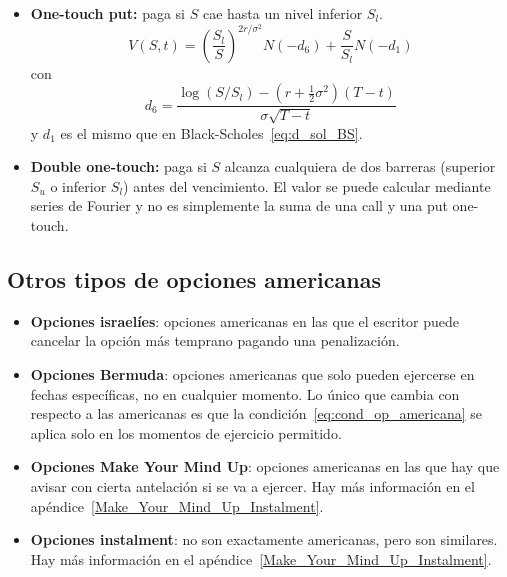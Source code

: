 \begin{itemize}
\begin{figure}[H]
\begin{subfigure}[b]{0.35\linewidth}
            \caption{Delta de una opción one-touch call}
        \end{subfigure}
    \end{figure}
    \item \textbf{One-touch put:} paga si $S$ cae hasta un nivel inferior $S_l$.
    \[
        \boxed{V(S, t) = \left( \frac{S_l}{S} \right)^{2r/\sigma^2} N(-d_6) + \frac{S}{S_l} N(-d_1)}
    \]
    con
    \[
        \boxed{d_6 = \frac{\log(S/S_l) - (r + \frac{1}{2}\sigma^2)(T-t)}{\sigma\sqrt{T-t}}}
    \]
    y $d_1$ es el mismo que en Black-Scholes~\eqref{eq:d_sol_BS}.
    \item \textbf{Double one-touch:} paga si $S$ alcanza cualquiera de dos barreras (superior $S_u$ o inferior $S_l$) antes del vencimiento. El valor se puede calcular mediante series de Fourier y no es simplemente la suma de una call y una put one-touch.
\end{itemize}




\subsection{Otros tipos de opciones americanas}
\begin{itemize}
    \item \textbf{Opciones israelíes}: opciones americanas en las que el escritor puede cancelar la opción más temprano pagando una penalización.
    \item \textbf{Opciones Bermuda}: opciones americanas que solo pueden ejercerse en fechas específicas, no en cualquier momento. Lo único que cambia con respecto a las americanas es que la condición~\eqref{eq:cond_op_americana} se aplica solo en los momentos de ejercicio permitido.
    \item \textbf{Opciones Make Your Mind Up}: opciones americanas en las que hay que avisar con cierta antelación si se va a ejercer. Hay más información en el apéndice~\ref{Make_Your_Mind_Up_Instalment}.
    \item \textbf{Opciones instalment}: no son exactamente americanas, pero son similares. Hay más información en el apéndice~\ref{Make_Your_Mind_Up_Instalment}.
\end{itemize}










